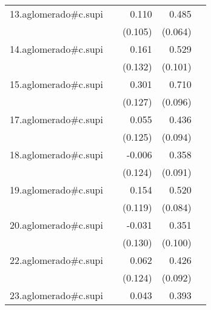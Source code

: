 {\begin{longtable}{l*{4}{D{.}{.}{-1}}}
\addlinespace
13.aglomerado#c.supi&                     &       0.110         &       0.485\sym{***}&                     \\
            &                     &     (0.105)         &     (0.064)         &                     \\
\addlinespace
14.aglomerado#c.supi&                     &       0.161         &       0.529\sym{***}&                     \\
            &                     &     (0.132)         &     (0.101)         &                     \\
\addlinespace
15.aglomerado#c.supi&                     &       0.301\sym{*}  &       0.710\sym{***}&                     \\
            &                     &     (0.127)         &     (0.096)         &                     \\
\addlinespace
17.aglomerado#c.supi&                     &       0.055         &       0.436\sym{***}&                     \\
            &                     &     (0.125)         &     (0.094)         &                     \\
\addlinespace
18.aglomerado#c.supi&                     &      -0.006         &       0.358\sym{***}&                     \\
            &                     &     (0.124)         &     (0.091)         &                     \\
\addlinespace
19.aglomerado#c.supi&                     &       0.154         &       0.520\sym{***}&                     \\
            &                     &     (0.119)         &     (0.084)         &                     \\
\addlinespace
20.aglomerado#c.supi&                     &      -0.031         &       0.351\sym{***}&                     \\
            &                     &     (0.130)         &     (0.100)         &                     \\
\addlinespace
22.aglomerado#c.supi&                     &       0.062         &       0.426\sym{***}&                     \\
            &                     &     (0.124)         &     (0.092)         &                     \\
\addlinespace
23.aglomerado#c.supi&                     &       0.043         &       0.393\sym{***}&                     \\

\end{longtable}}
